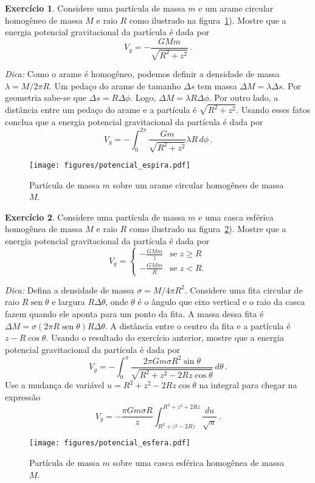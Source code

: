 \documentclass[12pt,a4paper]{article}
\theoremstyle{definition}
\newtheorem{ex}{Exercício}[section]
\DeclareMathOperator{\sen}{sen}
\begin{document}
\begin{ex}
  Considere uma partícula de massa $m$ e um arame circular homogêneo
  de massa $M$ e raio $R$ como ilustrado na
  figura~\ref{fig:potencial_espira}). Mostre que a energia potencial
  gravitacional da partícula é dada por
  $$V_g=-\frac{GMm}{\sqrt{R^2+z^2}}\,.$$

  \noindent\textit{Dica:} Como o arame é homogêneo, podemos definir a
  densidade de massa $\lambda=M/2\pi R$. Um pedaço do arame de tamanho
  $\Delta s$ tem massa $\Delta M=\lambda\Delta s$. Por geometria
  sabe-se que $\Delta s=R\Delta\phi$. Logo,
  $\Delta M=\lambda R\Delta\phi$. Por outro lado, a distância entre um
  pedaço do arame e a partícula é $\sqrt{R^2+z^2}$. Usando esses fatos
  conclua que a energia potencial gravitacional da partícula é dada
  por
  $$V_g=-\int_0^{2\pi}\frac{Gm}{\sqrt{R^2+z^2}}\lambda R\,d\phi\,.$$
  \begin{figure}[t]
    \centering
    \texttt{[image: figures/potencial\_espira.pdf]}
    \caption{Partícula de massa $m$ sobre um arame circular homogêneo
      de massa $M$.}
    \label{fig:potencial_espira}
  \end{figure}
\end{ex}

\begin{ex}
  \label{ex:potencial.casca}
  Considere uma partícula de massa $m$ e uma casca esférica homogênea
  de massa $M$ e raio $R$ como ilustrado na
  figura~\ref{fig:potencial_esfera}). Mostre que a energia potencial
  gravitacional da partícula é dada por
  $$V_g=
  \begin{cases}
    -\frac{GMm}{z}&\text{se $z\ge R$}\\
    -\frac{GMm}{R}&\text{se $z<R$.}
  \end{cases}
  $$

  \noindent\textit{Dica:} Defina a densidade de massa
  $\sigma=M/4\pi R^2$. Considere uma fita circular de raio
  $R\sen\theta$ e largura $R\Delta\theta$, onde $\theta$ é o ângulo
  que eixo vertical e o raio da casca fazem quando ele aponta para um
  ponto da fita. A massa dessa fita é
  $\Delta M=\sigma(2\pi R\sen\theta)R\Delta\theta$. A distância entre
  o centro da fita e a partícula é $z-R\cos\theta$. Usando o resultado
  do exercício anterior, mostre que a energia potencial gravitacional
  da partícula é dada por
  $$V_g=-\int_0^{\pi}\frac{2\pi Gm\sigma R^2\sin\theta}{\sqrt{R^2+z^2-2Rz\cos\theta}}\,d\theta\,.$$
  Use a mudança de variável $u=R^2+z^2-2Rz\cos\theta$ na integral para
  chegar na expressão
  $$V_g=-\frac{\pi Gm\sigma R}{z}\int_{R^2+z^2-2Rz}^{R^2+z^2+2Rz}\frac{du}{\sqrt{u}}\,.$$
  \begin{figure}[t]
    \centering
    \texttt{[image: figures/potencial\_esfera.pdf]}
    \caption{Partícula de massa $m$ sobre uma casca esférica homogênea
      de massa $M$.}
    \label{fig:potencial_esfera}
  \end{figure}
\end{ex}
\end{document}
